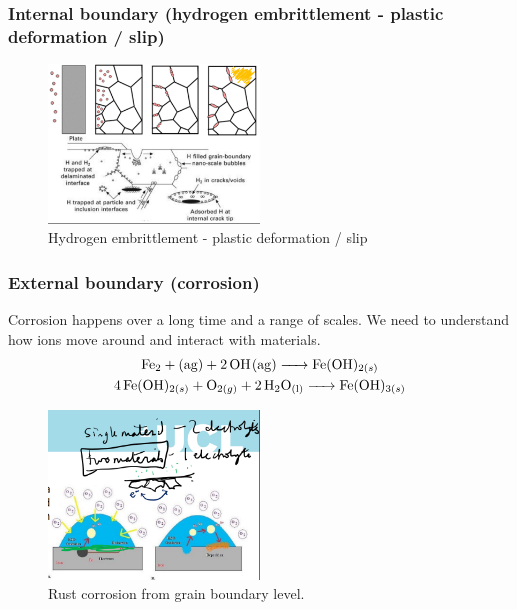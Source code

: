 \subsubsection{Internal boundary (hydrogen embrittlement - plastic deformation / slip)}
\begin{figure}[H]
	\centering
	\includegraphics[width = 0.5\textwidth]{./img/figure5.png}
	\caption{Hydrogen embrittlement - plastic deformation / slip}
\end{figure}
\subsubsection{External boundary (corrosion)}
Corrosion happens over a long time and a range of scales. We need to understand how ions move around and interact with materials.
\begin{gather}
	\ce{Fe2 + (ag) + 2OH(ag) -> Fe(OH)_{2(s)}}\\
	\ce{4Fe(OH)_{2(s)} + O_{2(g)} + 2H2O_{(l)} -> Fe(OH)_{3(s)}}
\end{gather}
\begin{figure}[H]
	\centering
	\includegraphics[width = 0.5\textwidth]{./img/figure6.png}
	\caption{Rust corrosion from grain boundary level.}
\end{figure}
